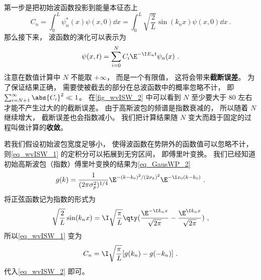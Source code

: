 第一步是把初始波函数投影到能量本征态上
\begin{equation}\label{eq_wvISW_1}
C_n = \int_0^L \psi _n^*(x) \psi (x,0) \dd{x}
= \int_0^L \sqrt{\frac{2}{L}} \sin(k_n x) \psi (x,0) \dd{x}~.
\end{equation}
那么接下来， 波函数的演化可以表示为
\begin{equation}\label{eq_wvISW_2}
\psi (x,t) = \sum _{i=0}^N C_i \E^{-\I E_n t} \psi _n(x)~.
\end{equation}
注意在数值计算中 $N$ 不能取 $+\infty$， 而是一个有限值， 这将会带来\textbf{截断误差}。 为了保证结果正确， 需要使被截去的部分在总波函数中的概率忽略不计， 即 $\sum_{i=N+1}^\infty \abs{C_i}^2 \ll 1$。 在\autoref{fig_wvISW_2} 中可以看到 $N$ 至少要大于 80 左右才能不产生过大的的截断误差。 由于高斯波包的频谱是指数衰减的， 所以随着 $N$ 继续增大， 截断误差也会指数减小。 我们把计算结果随 $N$ 变大而趋于固定的过程叫做计算的\textbf{收敛}。

若我们假设初始波包宽度足够小， 使得波函数在势阱外的函数值可以忽略不计， 则\autoref{eq_wvISW_1} 的定积分可以拓展到无穷区间， 即傅里叶变换。 我们已经知道初始高斯波包（指数）傅里叶变换的结果为\autoref{eq_GausWP_2}~
\begin{equation}
g(k) = \frac{1}{(2\pi \sigma _p^2)^{1/4}} \E^{-(k - k_0)^2/(2\sigma _k)^2} \E^{-\I x_0(k - k_0)}~.
\end{equation}
将正弦函数记为指数的形式为
\begin{equation}
\sqrt{\frac{2}{L}} \sin(k_n x) = \I \sqrt{\frac{\pi }{L}} \qty(\frac{\E^{-\I k_n x}}{\sqrt{2\pi }} - \frac{\E^{\I k_n x}}{\sqrt{2\pi }})~,
\end{equation}
所以\autoref{eq_wvISW_1} 变为
\begin{equation}
C_n = \I \sqrt{\frac{\pi }{L}} [g(k_n) - g(-k_n)]~.
\end{equation}
代入\autoref{eq_wvISW_2} 即可。
